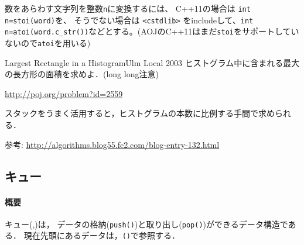 数をあらわす文字列を整数\texttt{n}に変換するには、
C++11の場合は \texttt{int n=stoi(word)}を、
そうでない場合は \texttt{<cstdlib>} をincludeして、\texttt{int n=atoi(word.c\_str())}などとする。(AOJのC++11はまだ\texttt{stoi}をサポートしていないので\texttt{atoi}を用いる)

\begin{pbox}{Largest Rectangle in a Histogram}{Ulm Local 2003}
  ヒストグラム中に含まれる最大の長方形の面積を求めよ．(long long注意)

\url{http://poj.org/problem?id=2559}
\end{pbox}

スタックをうまく活用すると，ヒストグラムの本数に比例する手間で求められ
る．

参考: \url{http://algorithms.blog55.fc2.com/blog-entry-132.html}

\subsection{キュー}\label{section:queue}
\paragraph{概要} キュー(,\pccbook[p.~32])は，
データの格納(\texttt{push()})と取り出し(\texttt{pop()})ができるデータ構造である．
現在先頭にあるデータは，\texttt{()}で参照する．

